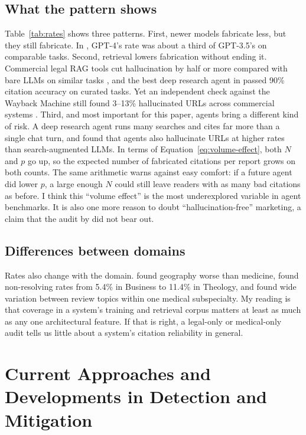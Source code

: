 \documentclass[acmsmall,screen]{acmart}
\begin{document}
\subsection{What the pattern shows}\label{sec:pattern}
Table~\ref{tab:rates} shows three patterns. First, newer models fabricate less, but they still fabricate. In \citet{walters2023}, GPT-4's rate was about a third of GPT-3.5's on comparable tasks. Second, retrieval lowers fabrication without ending it. Commercial legal RAG tools cut hallucination by half or more compared with bare LLMs on similar tasks \citep{magesh2025,dahl2024}, and the best deep research agent in \citet{du2025} passed 90\% citation accuracy on curated tasks. Yet an independent check against the Wayback Machine still found 3--13\% hallucinated URLs across commercial systems \citep{rao2026}. Third, and most important for this paper, agents bring a different kind of risk. A deep research agent runs many searches and cites far more than a single chat turn, and \citet{rao2026} found that agents also hallucinate URLs at higher rates than search-augmented LLMs. In terms of Equation~\eqref{eq:volume-effect}, both $N$ and $p$ go up, so the expected number of fabricated citations per report grows on both counts. The same arithmetic warns against easy comfort: if a future agent did lower $p$, a large enough $N$ could still leave readers with as many bad citations as before. I think this ``volume effect'' is the most underexplored variable in agent benchmarks. It is also one more reason to doubt ``hallucination-free'' marketing, a claim that the audit by \citet{magesh2025} did not bear out.

\subsection{Differences between domains}\label{sec:domain}
Rates also change with the domain. \citet{walters2023} found geography worse than medicine, \citet{rao2026} found non-resolving rates from 5.4\% in Business to 11.4\% in Theology, and \citet{chelli2024} found wide variation between review topics within one medical subspecialty. My reading is that coverage in a system's training and retrieval corpus matters at least as much as any one architectural feature. If that is right, a legal-only or medical-only audit tells us little about a system's citation reliability in general.

\section{Current Approaches and Developments in Detection and Mitigation}\label{sec:mitigation}
\end{document}
